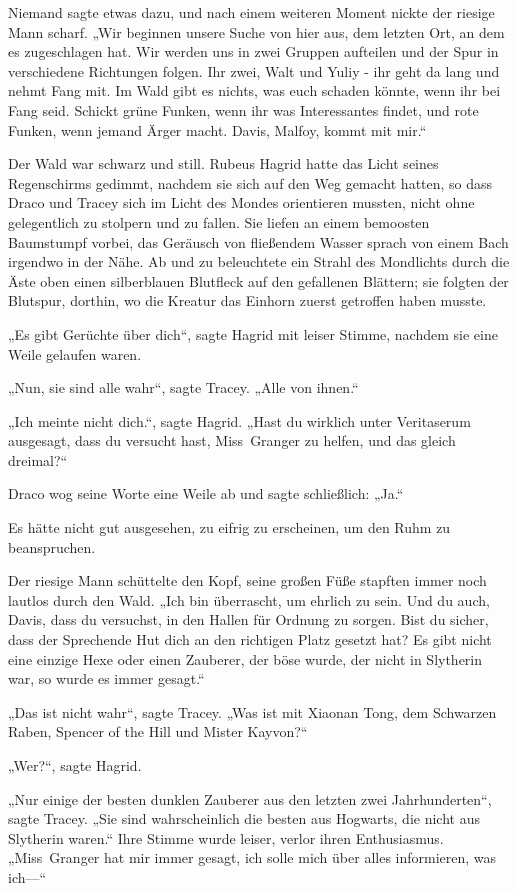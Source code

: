 {Niemand sagte etwas dazu, und nach einem weiteren Moment nickte der riesige Mann scharf. „Wir beginnen unsere Suche von hier aus, dem letzten Ort, an dem es zugeschlagen hat. Wir werden uns in zwei Gruppen aufteilen und der Spur in verschiedene Richtungen folgen. Ihr zwei, Walt und Yuliy - ihr geht da lang und nehmt Fang mit. Im Wald gibt es nichts, was euch schaden könnte, wenn ihr bei Fang seid. Schickt grüne Funken, wenn ihr was Interessantes findet, und rote Funken, wenn jemand Ärger macht. Davis, Malfoy, kommt mit mir.“

Der Wald war schwarz und still. Rubeus Hagrid hatte das Licht seines Regenschirms gedimmt, nachdem sie sich auf den Weg gemacht hatten, so dass Draco und Tracey sich im Licht des Mondes orientieren mussten, nicht ohne gelegentlich zu stolpern und zu fallen. Sie liefen an einem bemoosten Baumstumpf vorbei, das Geräusch von fließendem Wasser sprach von einem Bach irgendwo in der Nähe. Ab und zu beleuchtete ein Strahl des Mondlichts durch die Äste oben einen silberblauen Blutfleck auf den gefallenen Blättern; sie folgten der Blutspur, dorthin, wo die Kreatur das Einhorn zuerst getroffen haben musste.

„Es gibt Gerüchte über dich“, sagte Hagrid mit leiser Stimme, nachdem sie eine Weile gelaufen waren.

„Nun, sie sind alle wahr“, sagte Tracey. „Alle von ihnen.“

„Ich meinte nicht dich.“, sagte Hagrid. „Hast du wirklich unter Veritaserum ausgesagt, dass du versucht hast, Miss~Granger zu helfen, und das gleich dreimal?“

Draco wog seine Worte eine Weile ab und sagte schließlich: „Ja.“

Es hätte nicht gut ausgesehen, zu eifrig zu erscheinen, um den Ruhm zu beanspruchen.

Der riesige Mann schüttelte den Kopf, seine großen Füße stapften immer noch lautlos durch den Wald. „Ich bin überrascht, um ehrlich zu sein. Und du auch, Davis, dass du versuchst, in den Hallen für Ordnung zu sorgen. Bist du sicher, dass der Sprechende Hut dich an den richtigen Platz gesetzt hat? Es gibt nicht eine einzige Hexe oder einen Zauberer, der böse wurde, der nicht in Slytherin war, so wurde es immer gesagt.“

„Das ist nicht wahr“, sagte Tracey. „Was ist mit Xiaonan Tong, dem Schwarzen Raben, Spencer of the Hill und Mister Kayvon?“

„Wer?“, sagte Hagrid.

„Nur einige der besten dunklen Zauberer aus den letzten zwei Jahrhunderten“, sagte Tracey. „Sie sind wahrscheinlich die besten aus Hogwarts, die nicht aus Slytherin waren.“ Ihre Stimme wurde leiser, verlor ihren Enthusiasmus. „Miss~Granger hat mir immer gesagt, ich solle mich über alles informieren, was ich—“

}
